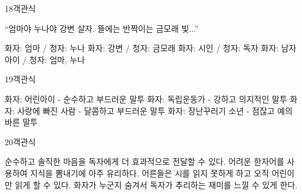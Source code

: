 \documentclass[fs95,seriesFre]{korfarm-base}
\begin{document}
\begin{kfQBlock}{18}{객관식}
\begin{kfEvidence}“엄마야 누나야 강변 살자. 뜰에는 반짝이는 금모래 빛...”\end{kfEvidence}
\begin{kfChoices}
\kfChoice 화자: 엄마 / 청자: 누나
\kfChoice 화자: 강변 / 청자: 금모래
\kfChoice 화자: 시인 / 청자: 독자
\kfChoice 화자: 남자아이 / 청자: 엄마, 누나
\end{kfChoices}
\end{kfQBlock}

\begin{kfQBlock}{19}{객관식}
\begin{kfChoices}
\kfChoice 화자: 어린아이 - 순수하고 부드러운 말투
\kfChoice 화자: 독립운동가 - 강하고 의지적인 말투
\kfChoice 화자: 사랑에 빠진 사람 - 달콤하고 부드러운 말투
\kfChoice 화자: 장난꾸러기 소년 - 점잖고 예의 바른 말투
\end{kfChoices}
\end{kfQBlock}

\begin{kfQBlock}{20}{객관식}
\begin{kfChoices}
\kfChoice 순수하고 솔직한 마음을 독자에게 더 효과적으로 전달할 수 있다.
\kfChoice 어려운 한자어를 사용하여 지식을 뽐내기에 아주 유리하다.
\kfChoice 어른들은 시를 읽지 못하게 하고 오직 어린이만 읽게 할 수 있다.
\kfChoice 화자가 누군지 숨겨서 독자가 추리하는 재미를 느낄 수 있게 한다.
\end{kfChoices}
\end{kfQBlock}




\clearpage

\begin{kfChapterAreaList}
\end{kfChapterAreaList}

\end{document}
